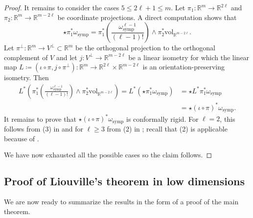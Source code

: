 \documentclass[a4paper,leqno,11pt]{amsart}
\numberwithin{equation}{section}
\theoremstyle{remark}
\theoremstyle{remark}
\newcommand{\R}{\mathbb{R}}
\newcommand{\vol}{\mathrm{vol}}
\newcommand{\symp}{\mathrm{symp}}
\begin{document}
\begin{proof}
It remains to consider the cases $5 \leq 2\ell + 1 \leq m$. Let $\pi_1 \colon \R^m \to \R^{2\ell}$ and $\pi_2 \colon \R^m \to \R^{m-2\ell}$ be coordinate projections. A direct computation shows that
\begin{equation*}
    \star \pi_{1}^{*}\omega_{\symp} = \pi_1^{*}\left( \frac{\omega_\symp^{\ell-1}}{(\ell-1)!} \right) \wedge \pi_{2}^{*}\vol_{ \R^{m-2\ell } }.
\end{equation*}
Let $\pi^{\perp} \colon \R^m \to V^{\perp} \subset \R^m$ be the orthogonal projection to the orthogonal complement of $V$ and let $j \colon V^{\perp} \rightarrow \mathbb{R}^{m-2\ell}$ be a linear isometry for which the linear map $L \coloneqq ( \iota \circ \pi, j \circ \pi^{\perp} ) \colon \mathbb{R}^m \to \R^{2\ell} \times \R^{m-2\ell}$ is an orientation-preserving isometry. Then
\begin{align*}
L^{*}\left( \pi_1^{*}\left( \frac{\omega_\symp^{\ell-1}}{(\ell-1)!} \right) \wedge \pi_{2}^{*}\vol_{ \R^{m-2\ell } } \right) = L^*\left( \star \pi_1^*\omega_\symp\right) 
    &= \star L^*\pi_1^*\omega_\symp 
    \\
    &= \star (\iota\circ \pi)^*\omega_\symp.
\end{align*}
It remains to prove that $\star (\iota \circ \pi)^{*}\omega_{\symp}$ is conformally rigid. For $\ell=2$, this follows from (3) in  and for $\ell\ge 3$ from (2) in ; recall that (2) is applicable because of .

We have now exhausted all the possible cases so the claim follows.
\end{proof}




\subsection{Proof of Liouville's theorem in low dimensions}
\label{sec:proof-of-classification}

We are now ready to summarize the results in the form of a proof of the main theorem.
\end{document}
